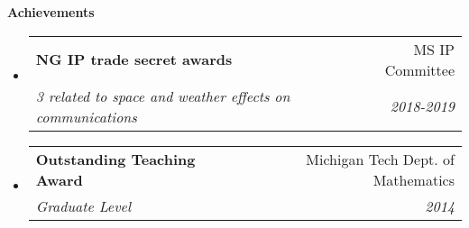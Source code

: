 \documentclass[letterpaper,11pt]{article}
\makeatletter
\newcommand{\resheading}[1]{{\large \textbf{#1}}}
\newcommand{\ressubheading}[4]{
\begin{tabular*}{6.5in}{l@{\extracolsep{\fill}}r}
		\textbf{#1} & #2 \\
		\textit{#3} & \textit{#4} \\
\end{tabular*}\vspace{-6pt}}
\makeatother
\begin{document}
\resheading{Achievements}
\begin{itemize}
\item
\ressubheading{NG IP trade secret awards}{MS IP Committee}{3 related to space and weather effects on communications}{2018-2019}
\item
\ressubheading{Outstanding Teaching Award}{Michigan Tech Dept. of Mathematics}{Graduate Level}{2014}
\begin{comment}
\item
\ressubheading{Co-Recipient of \href{http://www.mtu.edu/physics/department/profile/awards/shepherd.html}{Ian W. Shepherd award}}{Michigan Tech Dept. of Physics}{"presented each year to the most outstanding physics graduate(s)"}{2012}
\item
\ressubheading{Departmental Scholar}{Michigan Tech Dept. of Physics}{}{2011}
\item
\ressubheading{Certificate of Merit}{Dept. of Mathematical Sciences}{For my performance in the Applied Vector/Tensor Analysis course}{Dec. 2011}
\end{comment}
\end{itemize}
\end{document}
